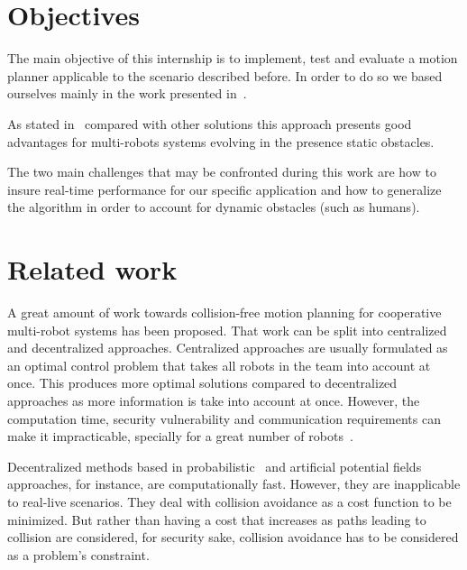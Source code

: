 
\section{Objectives}

The main objective of this internship is to implement, test and evaluate a motion planner applicable to the scenario described before. In order to do so we based ourselves mainly in the work presented in~\cite{Defoort2007a}.

As stated in~\cite{Defoort2007a} compared with other solutions
this approach presents good advantages for multi-robots systems evolving in the presence static obstacles.

The two main challenges that may be confronted during this work are how to insure real-time performance for our specific application and how to generalize the algorithm in order to account for dynamic obstacles (such as humans).


\section{Related work}

A great amount of work towards collision-free motion 
planning for cooperative multi-robot systems has been proposed. That work can
be split into centralized and decentralized approaches.
Centralized approaches are usually formulated as an optimal
control problem that takes all robots in the team into account at once.
This produces more optimal solutions compared to decentralized approaches as more information 
is take into account at once. However, the computation time, security vulnerability and communication 
requirements can make it impracticable, specially for a great number of 
robots~\cite{Borrelli2006}.

Decentralized methods based in probabilistic~\cite{Sanchez2002} and artificial 
potential fields~\cite{Khatib1986} approaches, for instance, are computationally fast.
However, they are inapplicable to real-live scenarios. They deal with collision avoidance as a cost function to be minimized. But rather than having a cost that increases as paths leading
to collision are considered, for security sake, collision avoidance has to be considered as a problem's constraint.

